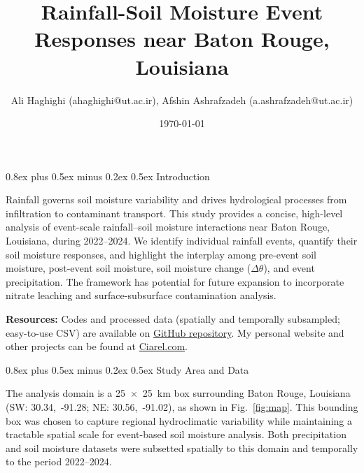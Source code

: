 \documentclass[9pt, twocolumn]{extarticle}
\title{Rainfall-Soil Moisture Event Responses near Baton Rouge, Louisiana}
\author{%
  \large Ali Haghighi \normalsize{(ahaghighi@ut.ac.ir)}\large, Afshin Ashrafzadeh \normalsize{(a.ashrafzadeh@ut.ac.ir)}
}
\date{\large \today}
\makeatletter
\renewcommand\section{\@startsection{section}{1}{0pt}%
  {0.8ex plus 0.5ex minus 0.2ex}%
  {0.5ex}%
  {\normalfont\Large\bfseries}}
\renewcommand{\maketitle}{\bgroup\setlength{\parindent}{0pt}
\vspace*{-\topskip}%
\begin{flushleft}
  \huge\textbf{\@title}

  \vspace{0.20cm}

  \normalsize\@author \hfill \normalsize\@date

  \vspace{0.25cm}\hrule\vspace{0.25cm}
\end{flushleft}
\egroup}
\makeatother
\begin{document}
\twocolumn[
  \begin{@twocolumnfalse}
    \maketitle
  \end{@twocolumnfalse}
]


\section{Introduction}

Rainfall governs soil moisture variability and drives hydrological processes from infiltration to contaminant transport. This study provides a concise, high-level analysis of event-scale rainfall–soil moisture interactions near Baton Rouge, Louisiana, during 2022–2024. We identify individual rainfall events, quantify their soil moisture responses, and highlight the interplay among pre-event soil moisture, post-event soil moisture, soil moisture change ($\Delta \theta$), and event precipitation. The framework has potential for future expansion to incorporate nitrate leaching and surface-subsurface contamination analysis.

\noindent\textbf{Resources: }
Codes and processed data (spatially and temporally subsampled; easy-to-use CSV) are available on \href{https://github.com/Alioax/rainfall-soil-moisture/}{GitHub repository}. 
My personal website and other projects can be found at \href{https://ciarel.com}{Ciarel.com}.


\section{Study Area and Data}

The analysis domain is a 25~$\times$~25~km box surrounding Baton Rouge, Louisiana (SW: 30.34,~-91.28; NE: 30.56,~-91.02), as shown in Fig.~\ref{fig:map}. This bounding box was chosen to capture regional hydroclimatic variability while maintaining a tractable spatial scale for event-based soil moisture analysis. Both precipitation and soil moisture datasets were subsetted spatially to this domain and temporally to the period 2022--2024.
\end{document}

